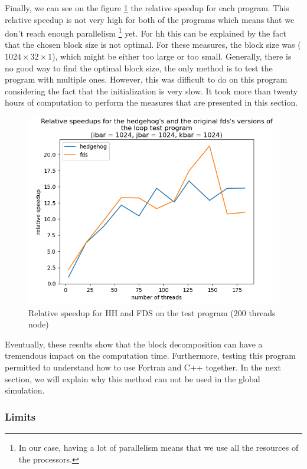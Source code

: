 Finally, we can see on the figure \ref{fig:loopsrelativespeedup} the relative
speedup for each program. This relative speedup is not very high for both of the
programs which means that we don't reach enough parallelism \footnote{In our
case, having a lot of parallelism means that we use all the resources of the
processors.} yet. For \gls{hh} this can be explained by the fact that the chosen
block size is not optimal. For these measures, the block size was
($1024\times32\times1$), which might be either too large or too small.
Generally, there is no good way to find the optimal block size, the only method
is to test the program with multiple ones. However, this was difficult to do on
this program considering the fact that the initialization is very slow. It took
more than twenty hours of computation to perform the measures that are presented
in this section.

\begin{figure}[ht!]
  \begin{center}
    \includegraphics[scale=0.6]{img/fds-loops/relative_speedup.png}
    \caption{Relative speedup for HH and FDS on the test program (200 threads node)}
    \label{fig:loopsrelativespeedup}
  \end{center}
\end{figure}

Eventually, these results show that the block decomposition can have a
tremendous impact on the computation time. Furthermore, testing this program
permitted to understand how to use Fortran and C++ together. In the next
section, we will explain why this method can not be used in the global
simulation.

\subsubsection{Limits}

